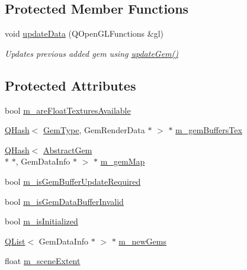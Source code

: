 \subsection*{Protected Member Functions}
\begin{DoxyCompactItemize}
\item 
void \hyperlink{class_gem_renderer_ada5ea2f54e918b16879d378cf84dab42}{update\+Data} (Q\+Open\+G\+L\+Functions \&gl)
\begin{DoxyCompactList}\small\item\em Updates previous added gem using \hyperlink{class_gem_renderer_a4be8d2a7b1443262392adc828f3910c8}{update\+Gem()} \end{DoxyCompactList}\end{DoxyCompactItemize}
\subsection*{Protected Attributes}
\begin{DoxyCompactItemize}
\item 
bool \hyperlink{class_gem_renderer_a09205046ea644ba35327843b208af1de}{m\+\_\+are\+Float\+Textures\+Available}
\item 
\hyperlink{singleton_q_hash}{Q\+Hash}$<$ \hyperlink{abstractgem_8h_a2f0a34b6dac35a9610cab7a1c5fcb444}{Gem\+Type}, Gem\+Render\+Data $\ast$ $>$ $\ast$ \hyperlink{class_gem_renderer_ac09a5c2581e1500071429a833cf2bc56}{m\+\_\+gem\+Buffers\+Tex}
\item 
\hyperlink{singleton_q_hash}{Q\+Hash}$<$ \hyperlink{class_abstract_gem}{Abstract\+Gem} \\*
$\ast$, Gem\+Data\+Info $\ast$ $>$ $\ast$ \hyperlink{class_gem_renderer_a549290c95d8ca95b163ca0fae08e11c8}{m\+\_\+gem\+Map}
\item 
bool \hyperlink{class_gem_renderer_a1c7545294804fd500e8e02ce106bb6ba}{m\+\_\+is\+Gem\+Buffer\+Update\+Required}
\item 
bool \hyperlink{class_gem_renderer_aabd20f07edbe436be86c9b29d4e05fa8}{m\+\_\+is\+Gem\+Data\+Buffer\+Invalid}
\item 
bool \hyperlink{class_gem_renderer_abedb030e36a36f2faa096727bfdd226d}{m\+\_\+is\+Initialized}
\item 
\hyperlink{singleton_q_list}{Q\+List}$<$ Gem\+Data\+Info $\ast$ $>$ $\ast$ \hyperlink{class_gem_renderer_ab93df8610036b343cdd98be3cd328aed}{m\+\_\+new\+Gems}
\item 
float \hyperlink{class_gem_renderer_a24391e7dfe1663b9c74210fb0424487d}{m\+\_\+scene\+Extent}
\end{DoxyCompactItemize}


